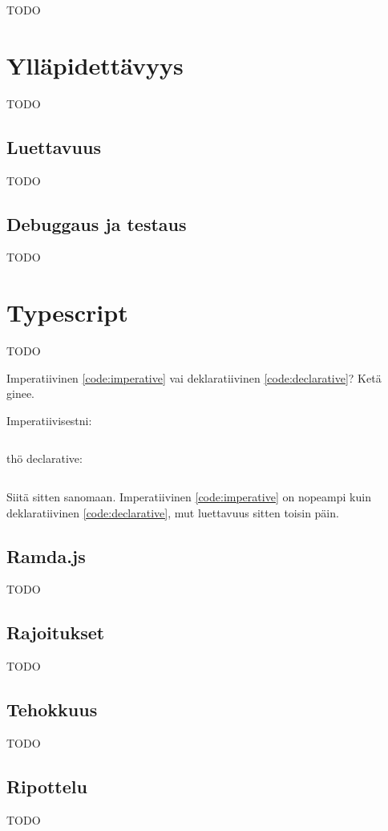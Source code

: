 TODO

\section{Ylläpidettävyys}

TODO

\subsection{Luettavuus}

TODO

\subsection{Debuggaus ja testaus}

TODO

\section{Typescript}

TODO

Imperatiivinen \ref{code:imperative} vai deklaratiivinen \ref{code:declarative}? Ketä ginee.

Imperatiivisestni:

\begin{code}
  \inputminted{javascript}{code/imperative.js}
  \label{code:imperative}
\end{code}

thö declarative:

\begin{code}
  \inputminted{javascript}{code/declarative.js}
  \label{code:declarative}
\end{code}

Siitä sitten sanomaan. Imperatiivinen \ref{code:imperative} on nopeampi kuin deklaratiivinen \ref{code:declarative}, mut luettavuus sitten toisin päin.

\subsection{Ramda.js}

TODO

\subsection{Rajoitukset}

TODO

\subsection{Tehokkuus}

TODO

\subsection{Ripottelu}

TODO